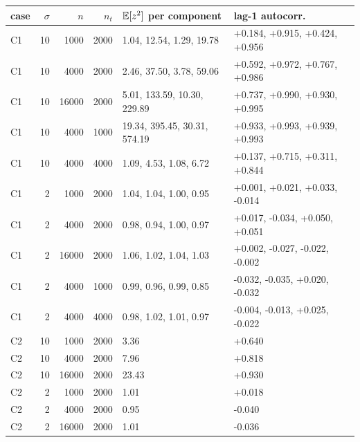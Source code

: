 \begin{tabular}{@{}lrrrll@{}}\toprule
case & $\sigma$ & $n$ & $n_t$ & $\mathbb{E}[z^2]$ per component & lag-1 autocorr.\\\midrule
C1 & 10 & 1000 & 2000 & 1.04, 12.54, 1.29, 19.78 & +0.184, +0.915, +0.424, +0.956\\
C1 & 10 & 4000 & 2000 & 2.46, 37.50, 3.78, 59.06 & +0.592, +0.972, +0.767, +0.986\\
C1 & 10 & 16000 & 2000 & 5.01, 133.59, 10.30, 229.89 & +0.737, +0.990, +0.930, +0.995\\
C1 & 10 & 4000 & 1000 & 19.34, 395.45, 30.31, 574.19 & +0.933, +0.993, +0.939, +0.993\\
C1 & 10 & 4000 & 4000 & 1.09, 4.53, 1.08, 6.72 & +0.137, +0.715, +0.311, +0.844\\
C1 & 2 & 1000 & 2000 & 1.04, 1.04, 1.00, 0.95 & +0.001, +0.021, +0.033, -0.014\\
C1 & 2 & 4000 & 2000 & 0.98, 0.94, 1.00, 0.97 & +0.017, -0.034, +0.050, +0.051\\
C1 & 2 & 16000 & 2000 & 1.06, 1.02, 1.04, 1.03 & +0.002, -0.027, -0.022, -0.002\\
C1 & 2 & 4000 & 1000 & 0.99, 0.96, 0.99, 0.85 & -0.032, -0.035, +0.020, -0.032\\
C1 & 2 & 4000 & 4000 & 0.98, 1.02, 1.01, 0.97 & -0.004, -0.013, +0.025, -0.022\\
C2 & 10 & 1000 & 2000 & 3.36 & +0.640\\
C2 & 10 & 4000 & 2000 & 7.96 & +0.818\\
C2 & 10 & 16000 & 2000 & 23.43 & +0.930\\
C2 & 2 & 1000 & 2000 & 1.01 & +0.018\\
C2 & 2 & 4000 & 2000 & 0.95 & -0.040\\
C2 & 2 & 16000 & 2000 & 1.01 & -0.036\\
\bottomrule\end{tabular}
